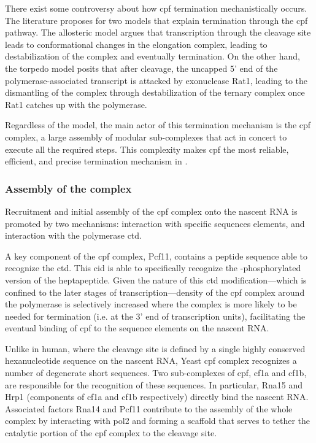There exist some controversy about how \gls{cpf} termination mechanistically occurs.
The literature proposes for two models that explain termination through the \gls{cpf} pathway.
The allosteric model argues that transcription through the cleavage site leads to conformational changes in the elongation complex, leading to destabilization of the complex and eventually termination.
On the other hand, the torpedo model posits that after cleavage, the uncapped 5' end of the polymerase-associated transcript is attacked by exonuclease Rat1, leading to the dismantling of the complex through destabilization of the ternary complex once Rat1 catches up with the polymerase.

Regardless of the model, the main actor of this termination mechanism is the \gls{cpf} complex, a large assembly of modular sub-complexes that act in concert to execute all the required steps. 
This complexity makes \gls{cpf} the most reliable, efficient, and precise termination mechanism in \cer{}.

\subsubsection{Assembly of the complex}
Recruitment and initial assembly of the \gls{cpf} complex onto the nascent RNA is promoted by two mechanisms: interaction with specific sequences elements, and interaction with the polymerase \gls{ctd}.

A key component of the \gls{cpf} complex, Pcf11, contains a peptide sequence able to recognize the \gls{ctd}. This \gls{cid} is able to specifically recognize the \sert{}-phosphorylated version of the heptapeptide.
Given the nature of this \gls{ctd} modification---which is confined to the later stages of transcription---density of the \gls{cpf} complex around the polymerase is selectively increased where the complex is more likely to be needed for termination (i.e. at the 3' end of transcription units), facilitating the eventual binding of \gls{cpf} to the sequence elements on the nascent RNA.

Unlike in human, where the cleavage site is defined by a single highly conserved hexanucleotide sequence on the nascent RNA, Yeast \gls{cpf} complex recognizes a number of degenerate short sequences.
Two sub-complexes of \gls{cpf}, \gls{cf1a} and \gls{cf1b}, are responsible for the recognition of these sequences.
In particular, Rna15 and Hrp1 (components of \gls{cf1a} and \gls{cf1b} respectively) directly bind the nascent RNA.
Associated factors Rna14 and Pcf11 contribute to the assembly of the whole complex by interacting with \gls{pol2} and forming a scaffold that serves to tether the catalytic portion of the \gls{cpf} complex to the cleavage site.

